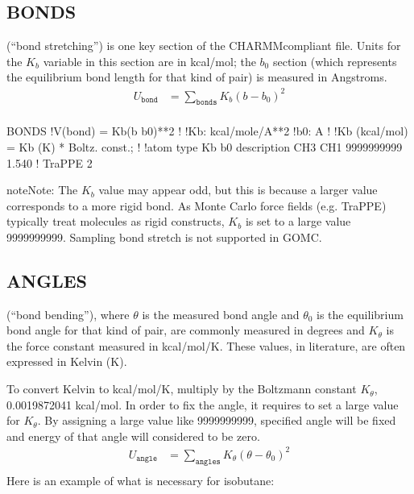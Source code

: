 \documentclass[letterpaper,10pt,english]{sphinxmanual}
\begin{document}
\subsection{BONDS}
\label{\detokenize{input_file:bonds}}
\sphinxAtStartPar
(“bond stretching”) is one key section of the CHARMM\sphinxhyphen{}compliant file. Units for the \(K_b\) variable in this section are in kcal/mol; the \(b_0\) section (which represents the equilibrium bond length for that kind of pair) is measured in Angstroms.
\begin{equation*}
\begin{split}U_{\texttt{bond}}&=\sum_{\texttt{bonds}} K_b(b-b_0)^2\\\end{split}
\end{equation*}
\begin{sphinxVerbatim}[commandchars=\\\{\}]
BONDS
!V(bond) = Kb(b \PYGZhy{} b0)**2
!
!Kb:  kcal/mole/A**2
!b0:  A
!
!Kb (kcal/mol) = Kb (K) * Boltz.  const.;
!
!atom type      Kb          b0     description
CH3   CH1   9999999999    1.540 !  TraPPE 2
\end{sphinxVerbatim}

\begin{sphinxadmonition}{note}{Note:}
\sphinxAtStartPar
The \(K_b\) value may appear odd, but this is because a larger value corresponds to a more rigid bond. As Monte Carlo force fields (e.g. TraPPE) typically treat molecules as rigid constructs, \(K_b\) is set to a large value \sphinxhyphen{} 9999999999. Sampling bond stretch is not supported in GOMC.
\end{sphinxadmonition}


\subsection{ANGLES}
\label{\detokenize{input_file:angles}}
\sphinxAtStartPar
(“bond bending”), where \(\theta\) is the measured bond angle and \(\theta_0\) is the equilibrium bond angle for that kind of pair, are commonly measured in degrees and \(K_\theta\) is the force constant measured in kcal/mol/K. These values, in literature, are often expressed in Kelvin (K).

\sphinxAtStartPar
To convert Kelvin to kcal/mol/K, multiply by the Boltzmann constant \textendash{} \(K_\theta\), 0.0019872041 kcal/mol. In order to fix the angle, it requires to set a large value for \(K_\theta\). By assigning a large value like 9999999999, specified angle will be fixed and energy of that angle will considered to be zero.
\begin{equation*}
\begin{split}U_{\texttt{angle}}&=\sum_{\texttt{angles}} K_{\theta}(\theta-\theta_0)^2\\\end{split}
\end{equation*}
\sphinxAtStartPar
Here is an example of what is necessary for isobutane:
\end{document}
